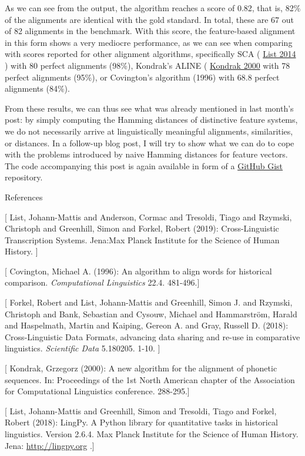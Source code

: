 \documentclass[
  a4paper,
  14pt,
  oneside,
  tablecaptionabove
]{scrbook}
\begin{document}
As we can see from the output, the algorithm reaches a score of 0.82,
that is, 82\% of the alignments are identical with the gold standard. In
total, these are 67 out of 82 alignments in the benchmark. With this
score, the feature-based alignment in this form shows a very mediocre
performance, as we can see when comparing with scores reported for other
alignment algorithms, specifically SCA (
\href{http://bibliography.lingpy.org?key=List2014d}{List 2014} ) with 80
perfect alignments (98\%), Kondrak's ALINE (
\href{http://bibliography.lingpy.org?key=Kondrak2000}{Kondrak 2000} with
78 perfect alignments (95\%), or Covington's algorithm (1996) with 68.8
perfect alignments (84\%).

From these results, we can thus see what was already mentioned in last
month's post: by simply computing the Hamming distances of distinctive
feature systems, we do not necessarily arrive at linguistically
meaningful alignments, similarities, or distances. In a follow-up blog
post, I will try to show what we can do to cope with the problems
introduced by naive Hamming distances for feature vectors. The code
accompanying this post is again available in form of a
\href{https://gist.github.com/LinguList/ce6da48112018365bccb94bcbec891b1}{GitHub
Gist} repository.

References

{[} List, Johann-Mattis and Anderson, Cormac and Tresoldi, Tiago and
Rzymski, Christoph and Greenhill, Simon and Forkel, Robert (2019):
Cross-Linguistic Transcription Systems. Jena:Max Planck Institute for
the Science of Human History. {]}

{[} Covington, Michael A. (1996): An algorithm to align words for
historical comparison. \emph{Computational Linguistics} 22.4.
481-496.{]}

{[} Forkel, Robert and List, Johann-Mattis and Greenhill, Simon J. and
Rzymski, Christoph and Bank, Sebastian and Cysouw, Michael and
Hammarström, Harald and Haspelmath, Martin and Kaiping, Gereon A. and
Gray, Russell D. (2018): Cross-Linguistic Data Formats, advancing data
sharing and re-use in comparative linguistics. \emph{Scientific Data}
5.180205. 1-10. {]}

{[} Kondrak, Grzegorz (2000): A new algorithm for the alignment of
phonetic sequences. In: Proceedings of the 1st North American chapter of
the Association for Computational Linguistics conference. 288-295.{]}

{[} List, Johann-Mattis and Greenhill, Simon and Tresoldi, Tiago and
Forkel, Robert (2018): LingPy. A Python library for quantitative tasks
in historical linguistics. Version 2.6.4. Max Planck Institute for the
Science of Human History. Jena: \href{//lingpy.org”}{http://lingpy.org}
.{]}
\end{document}
